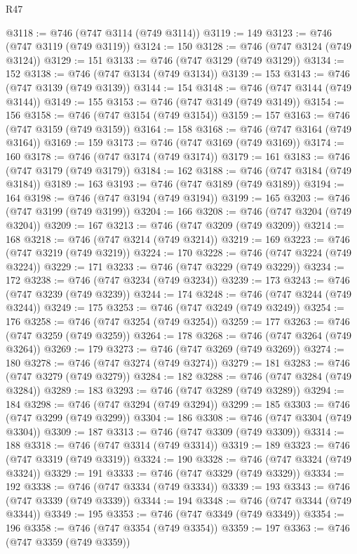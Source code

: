 \begin{lexlean}{R47}
\begin{coremodule}
@3118 := @746 (@747 @3114 (@749 @3114))
@3119 := 149
@3123 := @746 (@747 @3119 (@749 @3119))
@3124 := 150
@3128 := @746 (@747 @3124 (@749 @3124))
@3129 := 151
@3133 := @746 (@747 @3129 (@749 @3129))
@3134 := 152
@3138 := @746 (@747 @3134 (@749 @3134))
@3139 := 153
@3143 := @746 (@747 @3139 (@749 @3139))
@3144 := 154
@3148 := @746 (@747 @3144 (@749 @3144))
@3149 := 155
@3153 := @746 (@747 @3149 (@749 @3149))
@3154 := 156
@3158 := @746 (@747 @3154 (@749 @3154))
@3159 := 157
@3163 := @746 (@747 @3159 (@749 @3159))
@3164 := 158
@3168 := @746 (@747 @3164 (@749 @3164))
@3169 := 159
@3173 := @746 (@747 @3169 (@749 @3169))
@3174 := 160
@3178 := @746 (@747 @3174 (@749 @3174))
@3179 := 161
@3183 := @746 (@747 @3179 (@749 @3179))
@3184 := 162
@3188 := @746 (@747 @3184 (@749 @3184))
@3189 := 163
@3193 := @746 (@747 @3189 (@749 @3189))
@3194 := 164
@3198 := @746 (@747 @3194 (@749 @3194))
@3199 := 165
@3203 := @746 (@747 @3199 (@749 @3199))
@3204 := 166
@3208 := @746 (@747 @3204 (@749 @3204))
@3209 := 167
@3213 := @746 (@747 @3209 (@749 @3209))
@3214 := 168
@3218 := @746 (@747 @3214 (@749 @3214))
@3219 := 169
@3223 := @746 (@747 @3219 (@749 @3219))
@3224 := 170
@3228 := @746 (@747 @3224 (@749 @3224))
@3229 := 171
@3233 := @746 (@747 @3229 (@749 @3229))
@3234 := 172
@3238 := @746 (@747 @3234 (@749 @3234))
@3239 := 173
@3243 := @746 (@747 @3239 (@749 @3239))
@3244 := 174
@3248 := @746 (@747 @3244 (@749 @3244))
@3249 := 175
@3253 := @746 (@747 @3249 (@749 @3249))
@3254 := 176
@3258 := @746 (@747 @3254 (@749 @3254))
@3259 := 177
@3263 := @746 (@747 @3259 (@749 @3259))
@3264 := 178
@3268 := @746 (@747 @3264 (@749 @3264))
@3269 := 179
@3273 := @746 (@747 @3269 (@749 @3269))
@3274 := 180
@3278 := @746 (@747 @3274 (@749 @3274))
@3279 := 181
@3283 := @746 (@747 @3279 (@749 @3279))
@3284 := 182
@3288 := @746 (@747 @3284 (@749 @3284))
@3289 := 183
@3293 := @746 (@747 @3289 (@749 @3289))
@3294 := 184
@3298 := @746 (@747 @3294 (@749 @3294))
@3299 := 185
@3303 := @746 (@747 @3299 (@749 @3299))
@3304 := 186
@3308 := @746 (@747 @3304 (@749 @3304))
@3309 := 187
@3313 := @746 (@747 @3309 (@749 @3309))
@3314 := 188
@3318 := @746 (@747 @3314 (@749 @3314))
@3319 := 189
@3323 := @746 (@747 @3319 (@749 @3319))
@3324 := 190
@3328 := @746 (@747 @3324 (@749 @3324))
@3329 := 191
@3333 := @746 (@747 @3329 (@749 @3329))
@3334 := 192
@3338 := @746 (@747 @3334 (@749 @3334))
@3339 := 193
@3343 := @746 (@747 @3339 (@749 @3339))
@3344 := 194
@3348 := @746 (@747 @3344 (@749 @3344))
@3349 := 195
@3353 := @746 (@747 @3349 (@749 @3349))
@3354 := 196
@3358 := @746 (@747 @3354 (@749 @3354))
@3359 := 197
@3363 := @746 (@747 @3359 (@749 @3359))

\end{coremodule}
\end{lexlean}
